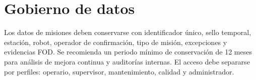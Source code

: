 \section{Gobierno de datos}

Los datos de misiones deben conservarse con identificador único, sello temporal, estación, robot, operador de confirmación, tipo de misión, excepciones y evidencias FOD. Se recomienda un periodo mínimo de conservación de 12 meses para análisis de mejora continua y auditorías internas. El acceso debe separarse por perfiles: operario, supervisor, mantenimiento, calidad y administrador.
